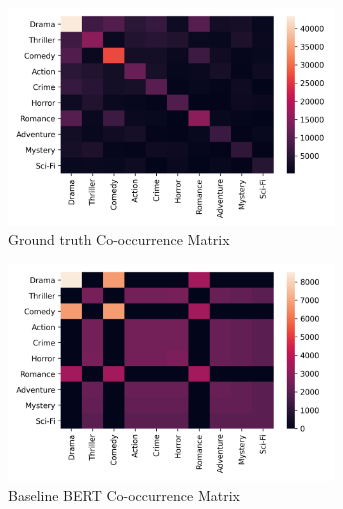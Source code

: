 \documentclass[10pt]{article}
\begin{document}
\begin{figure}[!h]
\centering
    \begin{subfigure}[l]{0.5\textwidth}
      \includegraphics[width=0.95\textwidth]{images/originalCoOccurrence.png}
      \caption{Ground truth Co-occurrence Matrix}
      \label{fig:cooccur}
    \end{subfigure}
    \begin{subfigure}[l]{0.5\textwidth}
        \centering
        \includegraphics[width=0.95\textwidth]{images/bertCoOccurrence.png}
        \caption{Baseline BERT Co-occurrence Matrix}
        \label{fig:bert_cooccurence}
    \end{subfigure}
    \begin{subfigure}[l]{0.5\textwidth}
        \centering

\end{subfigure}
\end{figure}
\end{document}
